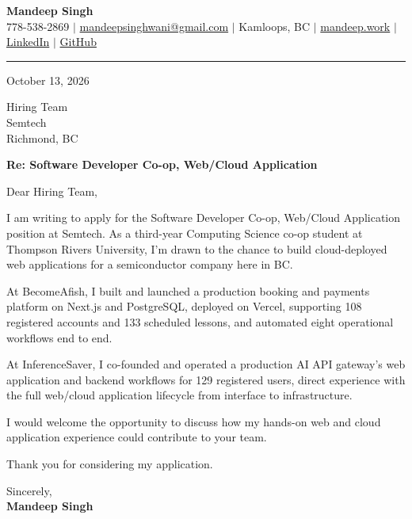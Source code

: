 \documentclass[letterpaper,11pt]{article}
\begin{document}
\begin{center}
    \textbf{\LARGE Mandeep Singh} \\ \vspace{2pt}
    \small 778-538-2869 $|$
    \href{mailto:mandeepsinghwani@gmail.com}{mandeepsinghwani@gmail.com} $|$
    Kamloops, BC $|$
    \href{https://mandeep.work}{mandeep.work} $|$
    \href{https://www.linkedin.com/in/mandeep-singh-b855972a7/}{LinkedIn} $|$
    \href{https://github.com/deepmroot}{GitHub}
\end{center}

\vspace{4pt}
\hrule
\vspace{14pt}

October 13, 2026

\vspace{8pt}
Hiring Team \\
Semtech \\
Richmond, BC

\vspace{8pt}
\textbf{Re: Software Developer Co-op, Web/Cloud Application}

\vspace{10pt}
Dear Hiring Team,

\vspace{4pt}
I am writing to apply for the Software Developer Co-op, Web/Cloud Application position at Semtech. As a third-year Computing Science co-op student at Thompson Rivers University, I'm drawn to the chance to build cloud-deployed web applications for a semiconductor company here in BC.

At BecomeAfish, I built and launched a production booking and payments platform on Next.js and PostgreSQL, deployed on Vercel, supporting 108 registered accounts and 133 scheduled lessons, and automated eight operational workflows end to end.

At InferenceSaver, I co-founded and operated a production AI API gateway's web application and backend workflows for 129 registered users, direct experience with the full web/cloud application lifecycle from interface to infrastructure.

I would welcome the opportunity to discuss how my hands-on web and cloud application experience could contribute to your team.

Thank you for considering my application.

\vspace{16pt}
Sincerely, \\
\vspace{6pt}
\textbf{Mandeep Singh}
\end{document}
